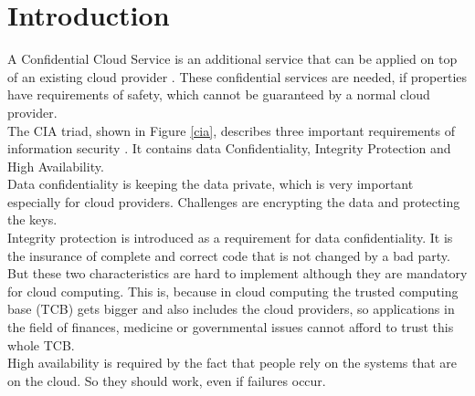 \section{Introduction}
	A Confidential Cloud Service is an additional service that can be applied on top of an existing cloud provider \cite{confidentiality}. These confidential services are needed, if properties have requirements of safety, which cannot be guaranteed by a normal cloud provider.   \\
	 The CIA triad,  shown in Figure \ref{cia},  describes three important requirements of information security \cite{ciaBook} \cite{cia}. It contains data Confidentiality, Integrity Protection and High Availability.\\
	  Data confidentiality is keeping the data private, which is very important especially for cloud providers. Challenges are encrypting the data and protecting the keys.\\
	   Integrity protection is introduced as a requirement for data confidentiality. It is the insurance of complete and correct code that is not changed by a bad party. But these two characteristics are hard to implement although they are mandatory for cloud computing. This is, because in cloud computing the trusted computing base (TCB) gets bigger and also includes the cloud providers, so applications in the field of finances, medicine or governmental issues cannot afford to trust this whole TCB.\\
	    High availability is required by the fact that people rely on the systems that are on the cloud. So they should work, even if failures occur.\\
	 